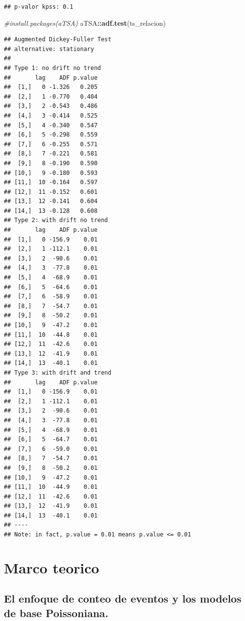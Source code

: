 \documentclass[
  oneside]{article}
\newenvironment{Shaded}{\begin{snugshade}}{\end{snugshade}}
\newcommand{\CommentTok}[1]{\textcolor[rgb]{0.56,0.35,0.01}{\textit{#1}}}
\newcommand{\FunctionTok}[1]{\textcolor[rgb]{0.13,0.29,0.53}{\textbf{#1}}}
\newcommand{\NormalTok}[1]{#1}
\newcommand{\SpecialCharTok}[1]{\textcolor[rgb]{0.81,0.36,0.00}{\textbf{#1}}}
\begin{document}
\begin{verbatim}
## p-valor kpss: 0.1
\end{verbatim}

\begin{Shaded}
\begin{Highlighting}[]
\CommentTok{\#install.packages(\textquotesingle{}aTSA\textquotesingle{})}
\NormalTok{aTSA}\SpecialCharTok{::}\FunctionTok{adf.test}\NormalTok{(ts\_relacion)}
\end{Highlighting}
\end{Shaded}

\begin{verbatim}
## Augmented Dickey-Fuller Test 
## alternative: stationary 
##  
## Type 1: no drift no trend 
##       lag    ADF p.value
##  [1,]   0 -1.326   0.205
##  [2,]   1 -0.770   0.404
##  [3,]   2 -0.543   0.486
##  [4,]   3 -0.414   0.525
##  [5,]   4 -0.340   0.547
##  [6,]   5 -0.298   0.559
##  [7,]   6 -0.255   0.571
##  [8,]   7 -0.221   0.581
##  [9,]   8 -0.190   0.590
## [10,]   9 -0.180   0.593
## [11,]  10 -0.164   0.597
## [12,]  11 -0.152   0.601
## [13,]  12 -0.141   0.604
## [14,]  13 -0.128   0.608
## Type 2: with drift no trend 
##       lag    ADF p.value
##  [1,]   0 -156.9    0.01
##  [2,]   1 -112.1    0.01
##  [3,]   2  -90.6    0.01
##  [4,]   3  -77.8    0.01
##  [5,]   4  -68.9    0.01
##  [6,]   5  -64.6    0.01
##  [7,]   6  -58.9    0.01
##  [8,]   7  -54.7    0.01
##  [9,]   8  -50.2    0.01
## [10,]   9  -47.2    0.01
## [11,]  10  -44.8    0.01
## [12,]  11  -42.6    0.01
## [13,]  12  -41.9    0.01
## [14,]  13  -40.1    0.01
## Type 3: with drift and trend 
##       lag    ADF p.value
##  [1,]   0 -156.9    0.01
##  [2,]   1 -112.1    0.01
##  [3,]   2  -90.6    0.01
##  [4,]   3  -77.8    0.01
##  [5,]   4  -68.9    0.01
##  [6,]   5  -64.7    0.01
##  [7,]   6  -59.0    0.01
##  [8,]   7  -54.7    0.01
##  [9,]   8  -50.2    0.01
## [10,]   9  -47.2    0.01
## [11,]  10  -44.9    0.01
## [12,]  11  -42.6    0.01
## [13,]  12  -41.9    0.01
## [14,]  13  -40.1    0.01
## ---- 
## Note: in fact, p.value = 0.01 means p.value <= 0.01
\end{verbatim}

\newpage

\section{Marco teorico}
\subsection{El enfoque de conteo de eventos y los modelos de base Poissoniana.}
\end{document}
